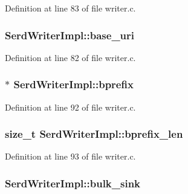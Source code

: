 Definition at line 83 of file writer.\+c.

\subsubsection[{\texorpdfstring{base\+\_\+uri}{base_uri}}]{ Serd\+Writer\+Impl\+::base\+\_\+uri}\hypertarget{struct_serd_writer_impl_ae17130ea21f914dedbf71c16dd6059e5}{}\label{struct_serd_writer_impl_ae17130ea21f914dedbf71c16dd6059e5}


Definition at line 82 of file writer.\+c.

\subsubsection[{\texorpdfstring{bprefix}{bprefix}}]{$\ast$ Serd\+Writer\+Impl\+::bprefix}\hypertarget{struct_serd_writer_impl_aee52b0f37a85353b23532eac5782d553}{}\label{struct_serd_writer_impl_aee52b0f37a85353b23532eac5782d553}


Definition at line 92 of file writer.\+c.

\subsubsection[{\texorpdfstring{bprefix\+\_\+len}{bprefix_len}}]{\setlength{\rightskip}{0pt plus 5cm}size\+\_\+t Serd\+Writer\+Impl\+::bprefix\+\_\+len}\hypertarget{struct_serd_writer_impl_ac164b6ed914e2eaf1db73113a103788a}{}\label{struct_serd_writer_impl_ac164b6ed914e2eaf1db73113a103788a}


Definition at line 93 of file writer.\+c.

\subsubsection[{\texorpdfstring{bulk\+\_\+sink}{bulk_sink}}]{ Serd\+Writer\+Impl\+::bulk\+\_\+sink}\hypertarget{struct_serd_writer_impl_a54a2ff42dd04d7d9288b9271aec4f130}{}\label{struct_serd_writer_impl_a54a2ff42dd04d7d9288b9271aec4f130}


